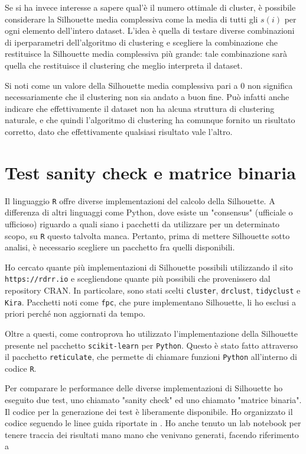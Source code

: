\documentclass[a4paper, 12pt]{report}
\begin{document}
			Se si ha invece interesse a sapere qual'è il numero ottimale di
			cluster, è possibile considerare la Silhouette media complessiva
			come la media di tutti gli $s(i)$ per ogni elemento dell'intero
			dataset. L'idea è quella di testare diverse combinazioni di
			iperparametri dell'algoritmo di clustering e scegliere la
			combinazione che restituisce la Silhouette media complessiva più
			grande: tale combinazione sarà quella che restituisce il clustering
			che meglio interpreta il dataset.

			Si noti come un valore della Silhouette media complessiva
			pari a $0$ non significa necessariamente che il clustering
			non sia andato a buon fine. Può infatti anche indicare che
			effettivamente il dataset non ha alcuna struttura di clustering
			naturale, e che quindi l'algoritmo di clustering ha comunque
			fornito un risultato corretto, dato che effettivamente qualsiasi
			risultato vale l'altro.

		\section{Test sanity check e matrice binaria}

			Il linguaggio \texttt{R} offre diverse implementazioni del
			calcolo della Silhouette. A differenza di altri linguaggi come
			Python, dove esiste un "consensus" (ufficiale o ufficioso) riguardo
			a quali siano i pacchetti da utilizzare per un determinato scopo,
			su \texttt{R} questo talvolta manca. Pertanto, prima di mettere
			Silhouette sotto analisi, è necessario scegliere un pacchetto fra
			quelli disponibili.

			Ho cercato quante più implementazioni di Silhouette possibili
			utilizzando il sito \texttt{https://rdrr.io} e scegliendone
			quante più possibili che provenissero dal repository CRAN.
			In particolare, sono stati scelti \texttt{cluster},
			\texttt{drclust}, \texttt{tidyclust} e \texttt{Kira}. Pacchetti
			noti come \texttt{fpc}, che pure implementano Silhouette, li ho
			esclusi a priori perché non aggiornati da tempo.

			Oltre a questi, come controprova ho utilizzato l'implementazione
			della Silhouette presente nel pacchetto \texttt{scikit-learn} per
			\texttt{Python}. Questo è stato fatto attraverso il pacchetto
			\texttt{reticulate}, che permette di chiamare funzioni \texttt{Python}
			all'interno di codice \texttt{R}.

			Per comparare le performance delle diverse implementazioni di
			Silhouette ho eseguito due test, uno chiamato "sanity check" ed
			uno chiamato "matrice binaria". Il codice per la generazione dei
			test è liberamente disponibile. Ho organizzato il codice seguendo
			le linee guida riportate in \cite{10.1371/journal.pcbi.1000424}.
			Ho anche tenuto un lab notebook per tenere traccia dei risultati
			mano mano che venivano generati, facendo riferimento a \cite{10.1371/journal.pcbi.1004385}
\end{document}
